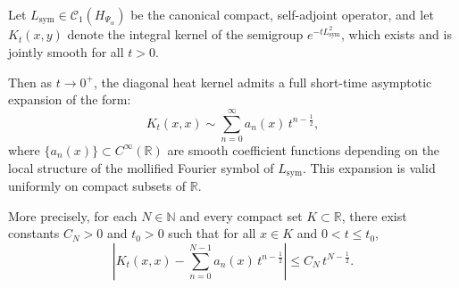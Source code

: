 \begin{lemma}
\label{lem:hk_expansion_uniform}
Let \( L_{\mathrm{sym}} \in \mathcal{C}_1(H_{\Psi_\alpha}) \) be the canonical compact, self-adjoint operator, and let \( K_t(x,y) \) denote the integral kernel of the semigroup \( e^{-t L_{\mathrm{sym}}^2} \), which exists and is jointly smooth for all \( t > 0 \).

Then as \( t \to 0^+ \), the diagonal heat kernel admits a full short-time asymptotic expansion of the form:
\[
K_t(x,x) \sim \sum_{n=0}^\infty a_n(x)\, t^{n - \frac{1}{2}},
\]
where \( \{ a_n(x) \} \subset C^\infty(\mathbb{R}) \) are smooth coefficient functions depending on the local structure of the mollified Fourier symbol of \( L_{\mathrm{sym}} \). This expansion is valid uniformly on compact subsets of \( \mathbb{R} \).

\medskip
\noindent
More precisely, for each \( N \in \mathbb{N} \) and every compact set \( K \subset \mathbb{R} \), there exist constants \( C_N > 0 \) and \( t_0 > 0 \) such that for all \( x \in K \) and \( 0 < t \le t_0 \),
\[
\left| K_t(x,x) - \sum_{n=0}^{N-1} a_n(x)\, t^{n - \frac{1}{2}} \right| \le C_N\, t^{N - \frac{1}{2}}.
\]
\end{lemma}
